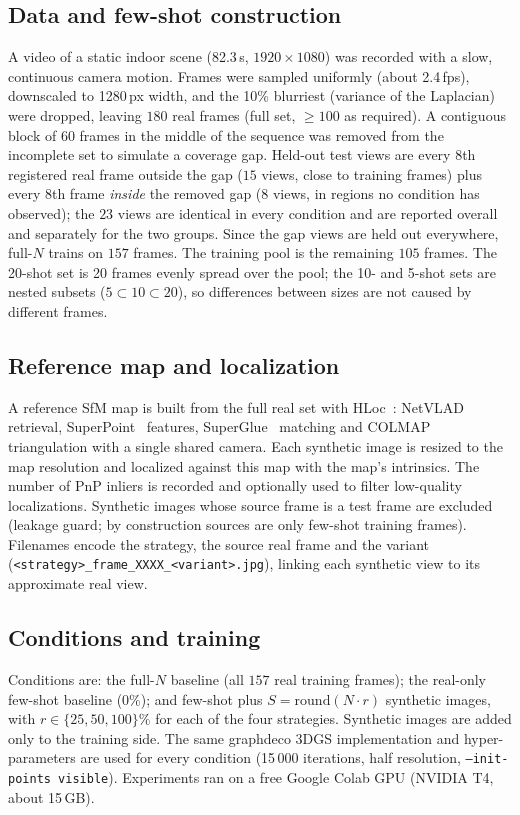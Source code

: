 \documentclass{article}
\begin{document}
\subsection{Data and few-shot construction}
A video of a static indoor scene (82.3\,s, $1920{\times}1080$) was recorded with a slow, continuous camera motion. Frames
were sampled uniformly (about 2.4\,fps), downscaled to 1280\,px width, and the 10\% blurriest (variance of the
Laplacian) were dropped, leaving $180$ real frames (full set, $\geq 100$ as required). A contiguous block of 60 frames
in the middle of the sequence was removed from the incomplete set to simulate a coverage gap. Held-out test views
are every 8th registered real frame outside the gap ($15$ views, close to training frames) plus every 8th frame \emph{inside} the removed gap ($8$ views, in regions no condition has observed); the $23$ views are identical in every condition and are reported overall and separately for the two groups. Since the gap views are held out everywhere, full-$N$ trains on $157$ frames.
The training pool is the remaining $105$ frames. The 20-shot set is 20 frames evenly spread over the pool; the 10- and 5-shot
sets are nested subsets ($5\subset10\subset20$), so differences between sizes are not caused by different frames.

\subsection{Reference map and localization}
A reference SfM map is built from the full real set with HLoc~\cite{sarlin2019hloc}: NetVLAD~\cite{arandjelovic2016netvlad} retrieval,
SuperPoint~\cite{detone2018superpoint} features, SuperGlue~\cite{sarlin2020superglue} matching and COLMAP triangulation with a single shared camera.
Each synthetic image is resized to the map resolution and localized against this map with the map's intrinsics.
The number of PnP inliers is recorded and optionally used to filter low-quality localizations. Synthetic
images whose source frame is a test frame are excluded (leakage guard; by construction sources are only
few-shot training frames). Filenames encode the strategy, the source real frame and the variant
(\texttt{<strategy>\_frame\_XXXX\_<variant>.jpg}), linking each synthetic view to its approximate real view.

\subsection{Conditions and training}
Conditions are: the full-$N$ baseline (all $157$ real training frames); the real-only few-shot baseline (0\%);
and few-shot plus $S=\mathrm{round}(N\cdot r)$ synthetic images, with $r\in\{25,50,100\}\%$ for each of the four strategies. Synthetic images are added only to the training side. The same
graphdeco 3DGS implementation and hyper-parameters are used for every condition
(15\,000 iterations, half resolution, \texttt{--init-points visible}). Experiments ran on a free Google Colab GPU (NVIDIA T4, about 15\,GB).
\end{document}
